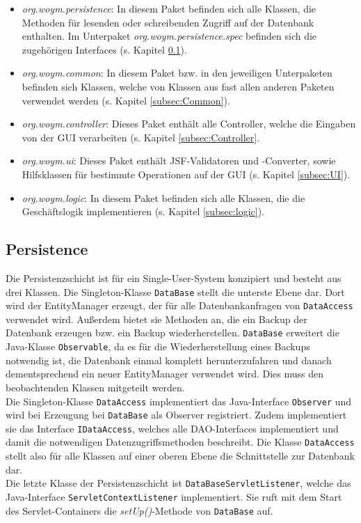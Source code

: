 \documentclass[fontsize=12pt,paper=a4,twoside]{scrartcl}
\begin{document}
\begin{itemize}
\item \textit{org.woym.persistence}: In diesem Paket befinden sich alle Klassen, die Methoden für lesenden oder schreibenden Zugriff auf der Datenbank enthalten. Im Unterpaket \textit{org.woym.persistence.spec} befinden sich die zugehörigen Interfaces (s. Kapitel \ref{subsec:persistence}).
\item \textit{org.woym.common}: In diesem Paket  bzw. in den jeweiligen Unterpaketen befinden sich Klassen, welche von Klassen aus fast allen anderen Paketen verwendet werden (s. Kapitel \ref{subsec:Common}). 
\item \textit{org.woym.controller}: Dieses Paket enthält alle Controller, welche die Eingaben von der GUI verarbeiten (s. Kapitel \ref{subsec:Controller}.
\item \textit{org.woym.ui}: Dieses Paket enthält JSF-Validatoren und -Converter, sowie Hilfsklassen für bestimmte Operationen auf der GUI (s. Kapitel \ref{subsec:UI}).
\item \textit{org.woym.logic}: In diesem Paket befinden sich alle Klassen, die die Geschäftslogik implementieren (s. Kapitel \ref{subsec:logic}).
\end{itemize}


\subsection{Persistence}
\label{subsec:persistence}

Die Persistenzschicht ist für ein Single-User-System konzipiert und besteht aus drei Klassen. Die Singleton-Klasse \texttt{DataBase} stellt die unterste Ebene dar. Dort wird der EntityManager erzeugt, der für alle Datenbankanfragen von \texttt{DataAccess} verwendet wird. Außerdem bietet sie Methoden an, die ein Backup der Datenbank erzeugen bzw. ein Backup wiederherstellen. \texttt{DataBase} erweitert die Java-Klasse \texttt{Observable}, da es für die Wiederherstellung eines Backups notwendig ist, die Datenbank einmal komplett herunterzufahren und danach dementsprechend ein neuer EntityManager verwendet wird. Dies muss den beobachtenden Klassen mitgeteilt werden.\\
Die Singleton-Klasse \texttt{DataAccess} implementiert das Java-Interface \texttt{Observer} und wird bei Erzeugung bei \texttt{DataBase} als Observer registriert. Zudem implementiert sie das Interface \texttt{IDataAccess}, welches alle DAO-Interfaces implementiert und damit die notwendigen Datenzugriffsmethoden beschreibt. Die Klasse \texttt{DataAccess} stellt also für alle Klassen auf einer oberen Ebene die Schnittstelle zur Datenbank dar.\\
Die letzte Klasse der Persistenzschicht ist \texttt{DataBaseServletListener}, welche das Java-Interface \texttt{ServletContextListener} implementiert. Sie ruft mit dem Start des Servlet-Containers die \textit{setUp()}-Methode von \texttt{DataBase} auf.\\
\end{document}
